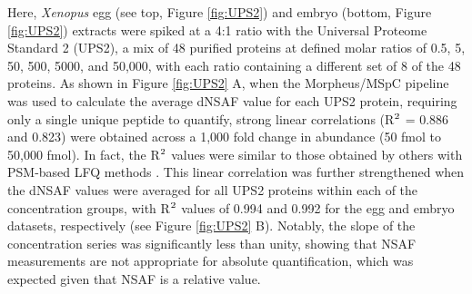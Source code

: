 Here, \textit{Xenopus} egg (see top, Figure \ref{fig:UPS2}) and embryo (bottom, Figure \ref{fig:UPS2}) extracts were spiked at a 4:1 ratio with the Universal Proteome Standard 2 (UPS2), a mix of 48 purified proteins at defined molar ratios of 0.5, 5, 50, 500, 5000, and 50,000, with each ratio containing a different set of 8 of the 48 proteins.
As shown in Figure \ref{fig:UPS2} A, when the Morpheus/MSpC pipeline was used to calculate the average dNSAF value for each UPS2 protein, requiring only a single unique peptide to quantify, strong linear correlations (R$\textsuperscript{2}$ = 0.886 and 0.823) were obtained across a 1,000 fold change in abundance (50 fmol to 50,000 fmol).
In fact, the R$\textsuperscript{2}$ values were similar to those obtained by others with PSM-based LFQ methods \citep{cox14, tu14}.
This linear correlation was further strengthened when the dNSAF values were averaged for all UPS2 proteins within each of the concentration groups, with R$\textsuperscript{2}$ values of 0.994 and 0.992 for the egg and embryo datasets, respectively (see Figure \ref{fig:UPS2} B).
Notably, the slope of the concentration series was significantly less than unity, showing that NSAF measurements are not appropriate for absolute quantification, which was expected given that NSAF is a relative value.  


